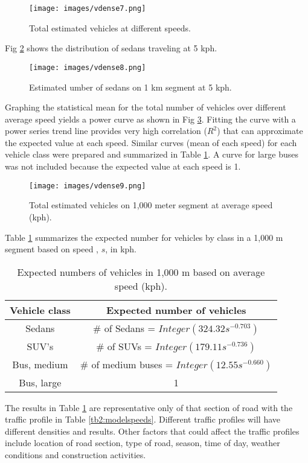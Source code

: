 %
\begin{figure}
\texttt{[image: images/vdense7.png]} 
\caption{Total estimated vehicles at different speeds.}
\label{fig7:estimatedobs}
\end{figure}
%
Fig \ref{fig8:estimatedobs} shows the distribution of sedans traveling at 5 kph.
%
\begin{figure}
\texttt{[image: images/vdense8.png]} 
\caption{Estimated umber of sedans on 1 km segment at 5 kph.}
\label{fig8:estimatedobs}
\end{figure}
% 

Graphing the statistical mean for the total number of vehicles over different average speed yields a power curve as shown in Fig \ref{fig9:estimateavemix}.  Fitting the curve with a power series trend line provides very high correlation ($R^{2}$) that can approximate the expected value at each speed.  Similar curves (mean of each speed) for each vehicle class were prepared and summarized in Table \ref{tb4:expectedvehicles}.  A curve for large buses was not included because the expected value at each speed is 1.

%
\begin{figure}
\texttt{[image: images/vdense9.png]} 
\caption{Total estimated vehicles on 1,000 meter segment at average speed (kph).}
\label{fig9:estimateavemix}
\end{figure}
% 

Table \ref{tb4:expectedvehicles} summarizes the expected number for vehicles by class in a 1,000 m segment based on speed , $s$, in kph.
%
\begin{table}[]
\centering
\caption{ Expected numbers of vehicles in 1,000 m based on average speed (kph).}
\label{tb4:expectedvehicles}
\begin{tabular}{@{}cc@{}}
\toprule
\textbf{Vehicle class} & \textbf{Expected number of vehicles } \\ \midrule
Sedans & \# of Sedans = $Integer (324.32s^{-0.703})$ \\
SUV's & \# of SUVs = $Integer (179.11s^{-0.736})$ \\
Bus, medium & \# of medium buses = $Integer (12.55s^{-0.660})$ \\
Bus, large & 1 \\ \bottomrule
\end{tabular}
\end{table}
%
The results in Table \ref{tb4:expectedvehicles} are representative only of that section of road with the traffic profile in Table \ref{tb2:modelspeeds}.  Different traffic profiles will have different densities and results.  Other factors that could affect the traffic profiles include location of road section, type of road, season, time of day, weather conditions and construction activities.  
